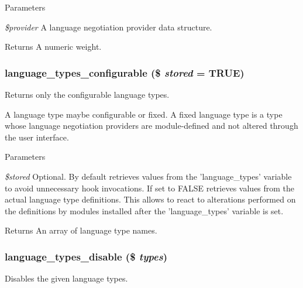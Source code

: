 \begin{DoxyParams}{Parameters}
\item[{\em \$provider}]A language negotiation provider data structure.\end{DoxyParams}
\begin{DoxyReturn}{Returns}
A numeric weight. 
\end{DoxyReturn}
\hypertarget{group__language__negotiation_gaa05284e85de23a8a8ab54adbd8548cb4}{
\subsubsection[{language\_\-types\_\-configurable}]{\setlength{\rightskip}{0pt plus 5cm}language\_\-types\_\-configurable (\$ {\em stored} = {\ttfamily TRUE})}}
\label{group__language__negotiation_gaa05284e85de23a8a8ab54adbd8548cb4}
Returns only the configurable language types.

A language type maybe configurable or fixed. A fixed language type is a type whose language negotiation providers are module-\/defined and not altered through the user interface.


\begin{DoxyParams}{Parameters}
\item[{\em \$stored}]Optional. By default retrieves values from the 'language\_\-types' variable to avoid unnecessary hook invocations. If set to FALSE retrieves values from the actual language type definitions. This allows to react to alterations performed on the definitions by modules installed after the 'language\_\-types' variable is set.\end{DoxyParams}
\begin{DoxyReturn}{Returns}
An array of language type names. 
\end{DoxyReturn}
\hypertarget{group__language__negotiation_ga04fd94cbb41f6b24ef9d3b4c37df86c1}{
\subsubsection[{language\_\-types\_\-disable}]{\setlength{\rightskip}{0pt plus 5cm}language\_\-types\_\-disable (\$ {\em types})}}
\label{group__language__negotiation_ga04fd94cbb41f6b24ef9d3b4c37df86c1}
Disables the given language types.


